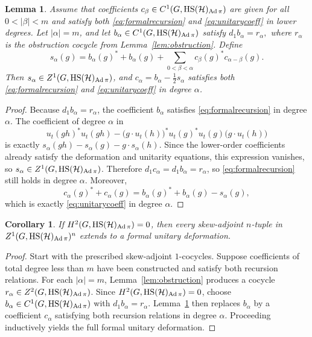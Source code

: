 \documentclass[12pt]{amsproc}
\theoremstyle{plain}
\newtheorem{corollary}[theorem]{Corollary}
\newtheorem{lemma}[theorem]{Lemma}
\theoremstyle{definition}
\numberwithin{equation}{section}
\newcommand{\HS}{{\rm HS}}
\DeclareMathOperator{\Ad}{Ad}
\begin{document}
\begin{lemma}\label{lem:formalcorrection}
Assume that coefficients $c_\beta\in C^1(G,\HS(\mathcal H)_{\Ad\pi})$ are given for all $0<|\beta|<m$ and satisfy both \eqref{eq:formalrecursion} and \eqref{eq:unitarycoeff} in lower degrees. Let $|\alpha|=m$, and let $b_\alpha\in C^1(G,\HS(\mathcal H)_{\Ad\pi})$ satisfy
$
d_1b_\alpha=r_\alpha,
$
where $r_\alpha$ is the obstruction cocycle from Lemma~\ref{lem:obstruction}. Define
\[
s_\alpha(g)=b_\alpha(g)^*+b_\alpha(g)+\sum_{0<\beta<\alpha}c_\beta(g)^*c_{\alpha-\beta}(g).
\]
Then $s_\alpha\in Z^1(G,\HS(\mathcal H)_{\Ad\pi})$, and
$
c_\alpha=b_\alpha-\frac12 s_\alpha
$
satisfies both \eqref{eq:formalrecursion} and \eqref{eq:unitarycoeff} in degree $\alpha$.
\end{lemma}

\begin{proof}
Because $d_1b_\alpha=r_\alpha$, the coefficient $b_\alpha$ satisfies \eqref{eq:formalrecursion} in degree $\alpha$. The coefficient of degree $\alpha$ in
\[
u_t(gh)^*u_t(gh)-\bigl(g\cdot u_t(h)\bigr)^*u_t(g)^*u_t(g)\bigl(g\cdot u_t(h)\bigr)
\]
is exactly
$
s_\alpha(gh)-s_\alpha(g)-g\cdot s_\alpha(h).
$
Since the lower-order coefficients already satisfy the deformation and unitarity equations, this expression vanishes, so $s_\alpha\in Z^1(G,\HS(\mathcal H)_{\Ad\pi})$. Therefore $d_1c_\alpha=d_1b_\alpha=r_\alpha$, so \eqref{eq:formalrecursion} still holds in degree $\alpha$. Moreover,
\[
c_\alpha(g)^*+c_\alpha(g)=b_\alpha(g)^*+b_\alpha(g)-s_\alpha(g),
\]
which is exactly \eqref{eq:unitarycoeff} in degree $\alpha$.
\end{proof}

\begin{corollary}\label{cor:formalexistence}
If $H^2(G,\HS(\mathcal H)_{\Ad\pi})=0$, then every skew-adjoint $n$-tuple in $Z^1(G,\HS(\mathcal H)_{\Ad\pi})^n$ extends to a formal unitary deformation.
\end{corollary}

\begin{proof}
Start with the prescribed skew-adjoint $1$-cocycles. Suppose coefficients of total degree less than $m$ have been constructed and satisfy both recursion relations. For each $|\alpha|=m$, Lemma~\ref{lem:obstruction} produces a cocycle $r_\alpha\in Z^2(G,\HS(\mathcal H)_{\Ad\pi})$. Since $H^2(G,\HS(\mathcal H)_{\Ad\pi})=0$, choose $b_\alpha\in C^1(G,\HS(\mathcal H)_{\Ad\pi})$ with $d_1b_\alpha=r_\alpha$. Lemma~\ref{lem:formalcorrection} then replaces $b_\alpha$ by a coefficient $c_\alpha$ satisfying both recursion relations in degree $\alpha$. Proceeding inductively yields the full formal unitary deformation.
\end{proof}
\end{document}
